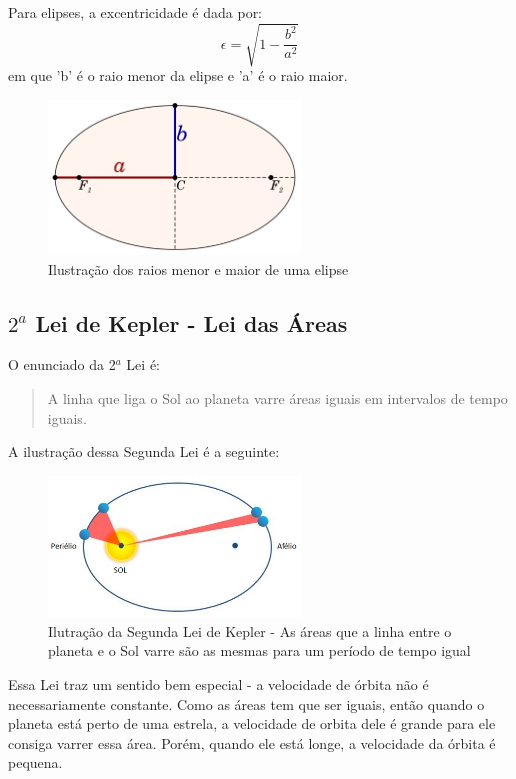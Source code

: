 \documentclass[12pt]{extarticle}
\newcommand{\<}{\langle}
\renewcommand{\>}{\rangle}
\theoremstyle{definition}
\begin{document}
Para elipses, a excentricidade é dada por:
\begin{equation}
    \epsilon = \sqrt{1- \frac{b^2}{a^2}}
\end{equation}
\noindent em que 'b' é o raio menor da elipse e 'a' é o raio maior.
\begin{figure}[H]
    \centering
    \includegraphics[width=0.6\textwidth]{1200px-Ellipse_semi-major_and_minor_axes.svg.png}
    \caption{Ilustração dos raios menor e maior de uma elipse}
    \label{fig:minor_major_radius}
\end{figure}

\subsection{$2^a$ Lei de Kepler - Lei das Áreas}
O enunciado da 2$^a$ Lei é:
\begin{quote}
    A linha que liga o Sol ao planeta varre áreas iguais em intervalos de tempo iguais.
\end{quote}

A ilustração dessa Segunda Lei é a seguinte:
\begin{figure}[H]
    \centering
    \includegraphics[width=0.6\textwidth]{segunda_lei.jpg}
    \caption{Ilutração da Segunda Lei de Kepler - As áreas que a linha entre o planeta e o Sol varre são as mesmas para um período de tempo igual}
    \label{fig:2nd_law}
\end{figure}

Essa Lei traz um sentido bem especial -  a velocidade de órbita não é necessariamente constante. Como as áreas tem que ser iguais, então quando o planeta está perto de uma estrela, a velocidade de orbita dele é grande para ele consiga varrer essa área. Porém, quando ele está longe, a velocidade da órbita é pequena. 
\end{document}
